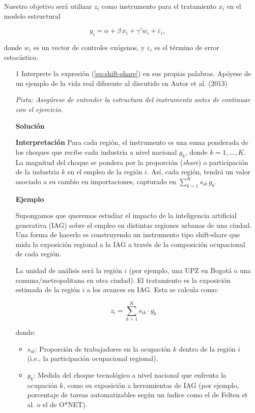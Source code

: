\documentclass[a4paper, answers, addpoints, 11pt]{exam}
\newenvironment{solucion}{%
  \begin{mdframed}[
    backgroundcolor=blue!5,    %
    linecolor=blue!50,          %
    linewidth=2pt,              %
    leftmargin=10pt,            %
    rightmargin=8pt,           %
    topline=true,              %
    bottomline=true,            %
    roundcorner=10pt,           %
    innerleftmargin=10pt,       %
    innerrightmargin=10pt,      %
    innerbottommargin=10pt,     %
    innertopmargin=10pt         %
  ]%
  \begin{tcolorbox}[colframe=blue!50!black, colback=blue!50, coltitle=white, sharp corners=all, boxrule=1mm, width=\textwidth, halign=left, valign=center, top=0mm, bottom=0mm, left=0mm, right=0mm] \textbf{Solución} \end{tcolorbox} }{\end{mdframed}}
\begin{document}
Nuestro objetivo será utilizar \(z_i\) como instrumento para el tratamiento \(x_i\) en el modelo estructural

\[
y_i = \alpha +\beta\,x_i + \gamma' w_i + \varepsilon_i,
\]

donde \(w_i\) es un vector de controles exógenos, y \(\varepsilon_i\) es el término de error estocástico.

\begin{enumerate}
    \item[1] Interprete la expresión (\ref{eq:shift-share}) en sus propias palabras. Apóyese de un ejemplo de la vida real diferente al discutido en Autor et al. (2013)
    
    
    \textit{Pista: Asegúrese de entender la estructura del instrumento antes de continuar con el ejercicio.}
\begin{solucion}
\textbf{Interpretación}
 Para cada región, el instrumento es una suma ponderada de los choques   que recibe cada industria a nivel nacional $g_k$, donde $k=1,\dots,K$. La magnitud del choque se pondera por la proporción (\textit{share}) o participación de la industria $k$ en el empleo de la región $i$. Así, cada región, tendrá un valor asociado a su cambio en importaciones, capturado en $\sum_{k=1}^{K} s_{ik}\,g_k$. 

\textbf{Ejemplo}

Supongamos que queremos estudiar el impacto de la inteligencia artificial generativa (IAG) sobre el empleo en distintas regiones urbanas de una ciudad. Una forma de hacerlo es construyendo un instrumento tipo shift-share que mida la exposición regional a la IAG a través de la composición ocupacional de cada región.

La unidad de análisis será la región \( i \) (por ejemplo, una UPZ en Bogotá o una comuna/metropolitana en otra ciudad). El tratamiento es la exposición estimada de la región \( i \) a los avances en IAG. Esta se calcula como:

\[
z_i = \sum_{k=1}^{K} s_{ik} \cdot g_k
\]

donde:
\begin{itemize}
    \item \( s_{ik} \): Proporción de trabajadores en la ocupación \( k \) dentro de la región \( i \) (i.e., la participación ocupacional regional).
    \item \( g_k \): Medida del choque tecnológico a nivel nacional que enfrenta la ocupación \( k \), como su exposición a herramientas de IAG (por ejemplo, porcentaje de tareas automatizables según un índice como el de Felten et al. o el de O*NET).
\end{itemize}


\end{solucion}
\end{enumerate}
\end{document}
